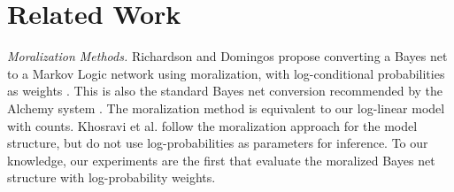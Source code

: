 \documentclass[twoside,leqno,twocolumn]{article}
\begin{document}
%
%
%

\section{Related Work} \label{sec:related} 

{\em Moralization Methods.} 
Richardson and Domingos propose converting a Bayes net to a Markov Logic network using moralization, with log-conditional probabilities as weights \cite{Domingos2007}. This is also the standard Bayes net conversion recommended by the Alchemy system \cite{bib:bayes-convert}. The moralization method is equivalent to our log-linear model with counts. Khosravi et al. \cite{Schulte2012} follow the moralization approach for the model structure, but do not use log-probabilities as parameters for inference. 
To our knowledge, our experiments are the first that evaluate the moralized Bayes net structure with log-probability weights. 
\end{document}
